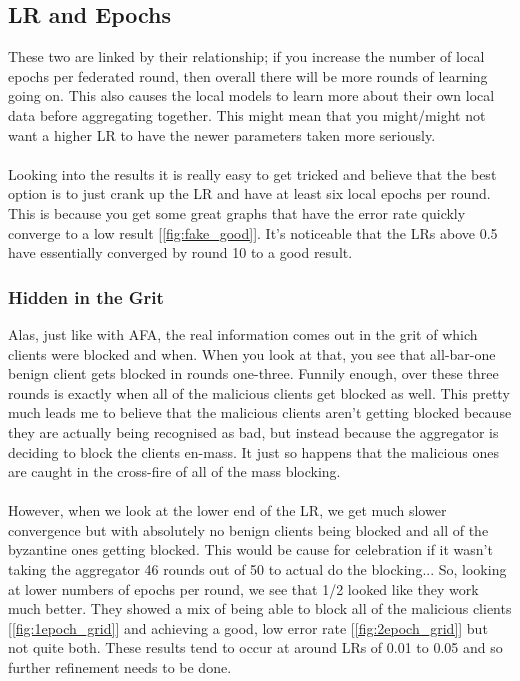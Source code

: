 \subsection{LR and Epochs}
These two are linked by their relationship; if you increase the number of local epochs per federated round, then overall there will be more rounds of learning going on. 
This also causes the local models to learn more about their own local data before aggregating together. 
This might mean that you might/might not want a higher LR to have the newer parameters taken more seriously.
\\ \\
Looking into the results it is really easy to get tricked and believe that the best option is to just crank up the LR and have at least six local epochs per round. 
This is because you get some great graphs that have the error rate quickly converge to a low result [\ref{fig:fake_good}].
It's noticeable that the LRs above 0.5 have essentially converged by round 10 to a good result.

\subsubsection{Hidden in the Grit}

Alas, just like with AFA, the real information comes out in the grit of which clients were blocked and when.
When you look at that, you see that all-bar-one benign client gets blocked in rounds one-three.
Funnily enough, over these three rounds is exactly when all of the malicious clients get blocked as well.
This pretty much leads me to believe that the malicious clients aren't getting blocked because they are actually being recognised as bad, but instead because the aggregator is deciding to block the clients en-mass.
It just so happens that the malicious ones are caught in the cross-fire of all of the mass blocking.
\\ \\
However, when we look at the lower end of the LR, we get much slower convergence but with absolutely no benign clients being blocked and all of the byzantine ones getting blocked.
This would be cause for celebration if it wasn't taking the aggregator 46 rounds out of 50 to actual do the blocking...
So, looking at lower numbers of epochs per round, we see that 1/2 looked like they work much better.
They showed a mix of being able to block all of the malicious clients [\ref{fig:1epoch_grid}] and achieving a good, low error rate [\ref{fig:2epoch_grid}] but not quite both.
These results tend to occur at around LRs of 0.01 to 0.05 and so further refinement needs to be done.

